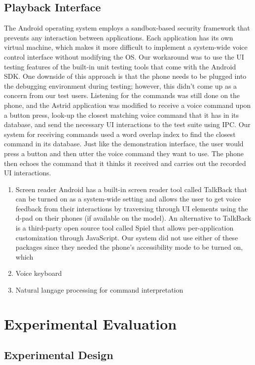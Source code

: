 \documentclass[letterpaper]{article}
\begin{document}
\subsection{Playback Interface}
The Android operating system employs a sandbox-based security framework that prevents any interaction between applications. 
Each application has its own virtual machine, which makes it more difficult to implement a system-wide voice control interface without modifying the OS.
Our workaround was to use the UI testing features of the built-in unit testing tools that come with the Android SDK.
One downside of this approach is that the phone needs to be plugged into the debugging environment during testing; however, 
this didn't come up as a concern from our test users. Listening for the commands was still done on the phone, 
and the Astrid application was modified to receive a voice command upon a button press, look-up the closest matching voice command 
that it has in its database, and send the necessary UI interactions to the test suite using IPC. Our system for receiving commands used 
a word overlap index to find the closest command in its database. Just like the demonstration interface, the user would press a button 
and then utter the voice command they want to use. The phone then echoes the command that it thinks it received and carries out the 
recorded UI interactions. 
 
\begin{enumerate}
\item Screen reader
Android has a built-in screen reader tool called TalkBack that can be turned on as a system-wide setting and allows the user to get 
voice feedback from their interactions by traversing through UI elements using the d-pad on their phones (if available on the model). 
An alternative to TalkBack is a third-party open source tool called Spiel that allows per-application customization through JavaScript. 
Our system did not use either of these packages since they needed the phone's accessibility mode to be turned on, which 
\item Voice keyboard
\item Natural langage processing for command interpretation
\end{enumerate}

\section{Experimental Evaluation}
\subsection{Experimental Design}
\end{document}
